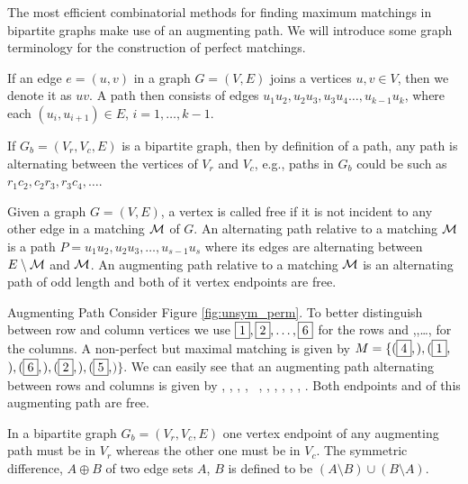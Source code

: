 The most efficient combinatorial methods for finding maximum matchings
in bipartite graphs make use of an augmenting path. We will
introduce some graph terminology for the
 construction of perfect
matchings. 
\begin{definition}\label{def:path}
If an edge $e=(u,v)$ in a graph $G=(V,E)$
joins a vertices $u,v\in V$, then we denote it as $uv$. 
A path then consists of edges $u_1u_2,u_2u_3,u_3u_4 \ldots,u_{k-1}u_k$, where 
each $(u_i,u_{i+1})\in E$, $i=1,\dots,k-1$.
\end{definition}
If $G_b=(V_r,V_c,E)$ is a bipartite graph, then by definition of a path, 
any path is alternating between the vertices of $V_r$ and $V_c$, e.g.,
paths in $G_b$ could be such as $r_1c_2,c_2r_3,r_3c_4,\dots$.
\begin{definition}\label{def:various-paths}
Given a graph $G=(V,E)$, a 
vertex is called free if it is not
incident to any other edge in a matching $\mathcal{M}$ of $G$. 
An alternating path relative to a matching $\mathcal{M}$ is a path
$P = u_1u_2,u_2u_3, \ldots,u_{s-1}u_s$ where its edges are alternating 
between $E \setminus \mathcal{M}$ and $\mathcal{M}$. An
augmenting path relative to a matching $\mathcal{M}$ is an alternating
path of odd length and both of it vertex endpoints are free. 
\end{definition}
\begin{example}{Augmenting Path}\label{exm:augmenting_path}
Consider Figure \ref{fig:unsym_perm}.
To better distinguish between row and column vertices we use
$\fbox{$1$},\fbox{$2$},\dots,\fbox{$6$}$ for the rows and ,,\dots, for the
columns.
A non-perfect but maximal matching is given by
$M= \{(\fbox{$4$},$$), (\fbox{$1$},$$), (\fbox{$6$},$$),\\ (\fbox{$2$},$$), (\fbox{$5$},$$) \}$.
We can easily see that an augmenting path 
alternating between rows and columns is given by  ,  ,  ,  , ~,  ,  ,  ,  ,  , . Both endpoints  and 
of this augmenting path are free.
\end{example}

In a bipartite
graph $G_b= (V_r, V_c, E)$ one vertex endpoint of any
augmenting path must be in $V_r$ whereas the other one must be in $V_c$. 
The symmetric
difference, $A \oplus B$ of two edge sets $A$, $B$ is defined to be $(A
\setminus B) \cup (B \setminus A)$.

